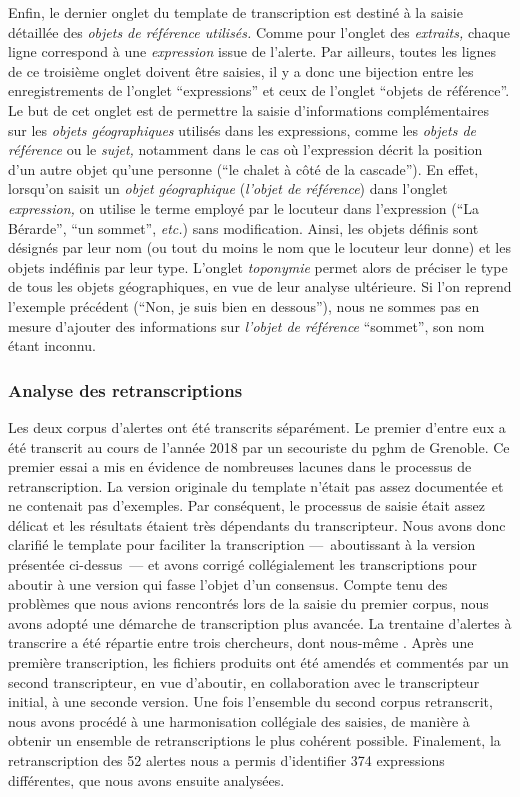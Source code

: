 Enfin, le dernier onglet du template de transcription est destiné à la
saisie détaillée des \emph{objets de référence utilisés.} Comme pour
l'onglet des \emph{extraits,} chaque ligne correspond à une
\emph{expression} issue de l'alerte. Par ailleurs, toutes les lignes
de ce troisième onglet doivent être saisies, il y a donc une bijection
entre les enregistrements de l'onglet \enquote{expressions} et ceux de
l'onglet \enquote{objets de référence}. Le but de cet onglet est de
permettre la saisie d'informations complémentaires sur les
\emph{objets géographiques} utilisés dans les expressions, comme les
\emph{objets de référence} ou le \emph{sujet,} notamment dans le cas
où l'expression décrit la position d'un autre objet qu'une personne
(\eg \enquote{le chalet à côté de la cascade}). En effet, lorsqu'on
saisit un \emph{objet géographique} (\eg \emph{l'objet de référence})
dans l'onglet \emph{expression,} on utilise le terme employé par le
locuteur dans l'expression (\eg \enquote{La Bérarde}, \enquote{un
  sommet}, \emph{etc.}) sans modification. Ainsi, les objets définis
sont désignés par leur nom (ou tout du moins le nom que le locuteur
leur donne) et les objets indéfinis par leur type. L'onglet
\emph{toponymie} permet alors de préciser le type de tous les objets
géographiques, en vue de leur analyse ultérieure. Si l'on reprend
l'exemple précédent (\ie \enquote{Non, je suis bien en dessous}), nous
ne sommes pas en mesure d'ajouter des informations sur \emph{l'objet
  de référence} \enquote{sommet}, son nom étant inconnu.

\subsubsection{Analyse des retranscriptions}

Les deux corpus d'alertes ont été transcrits séparément. Le premier
d'entre eux a été transcrit au cours de l'année 2018 par un secouriste
du \ac{pghm} de Grenoble. Ce premier essai a mis en évidence de
nombreuses lacunes dans le processus de retranscription. La version
originale du template n'était pas assez documentée et ne contenait pas
d'exemples. Par conséquent, le processus de saisie était assez délicat
et les résultats étaient très dépendants du transcripteur. Nous avons
donc clarifié le template pour faciliter la transcription
---~aboutissant à la version présentée ci-dessus~--- et avons corrigé
collégialement les transcriptions pour aboutir à une version qui fasse
l'objet d'un consensus. Compte tenu des problèmes que nous avions
rencontrés lors de la saisie du premier corpus, nous avons adopté une
démarche de transcription plus avancée. La trentaine d'alertes à
transcrire a été répartie entre trois chercheurs, dont nous-même
\autocite{Bunel2019}. Après une première transcription, les fichiers
produits ont été amendés et commentés par un second transcripteur, en
vue d'aboutir, en collaboration avec le transcripteur initial, à une
seconde version. Une fois l'ensemble du second corpus retranscrit,
nous avons procédé à une harmonisation collégiale des saisies, de
manière à obtenir un ensemble de retranscriptions le plus cohérent
possible. Finalement, la retranscription des 52 alertes nous a permis
d'identifier 374 expressions différentes, que nous avons ensuite
analysées.

